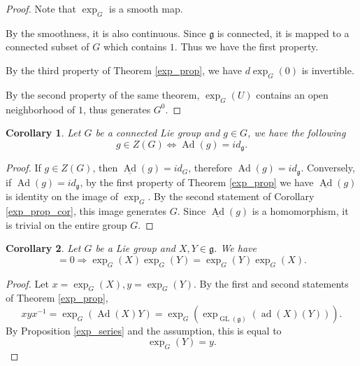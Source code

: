 \documentclass{article}
\newtheorem{corollary}{Corollary}[section]
\numberwithin{equation}{section}
\DeclareMathOperator{\Ad}{Ad}
\DeclareMathOperator{\ad}{ad}
\DeclareMathOperator{\GL}{GL}
\begin{document}
\begin{proof}Note that $\exp_G$ is a smooth map.\\
\par By the smoothness, it is also continuous. Since $\mathfrak{g}$ is connected, it is mapped to a connected subset of $G$ which contains $1$. Thus we have the first property.\\
\par By the third property of Theorem \ref{exp_prop}, we have $d\exp_G(0)$ is invertible.\\
\par By the second property of the same theorem, $\exp_G(U)$ contains an open neighborhood of $1$, thus generates $G^0$.
\end{proof}

\begin{corollary}
Let $G$ be a connected Lie group and $g\in G$, we have the following
\begin{equation*}
g\in Z(G) \Leftrightarrow \Ad(g) = id_{\mathfrak{g}}.
\end{equation*}
\end{corollary}

\begin{proof}
If $g\in Z(G)$, then $\underline{\Ad}(g) = id_G$, therefore $\Ad(g)=id_{\mathfrak{g}}$. Conversely, if $\Ad(g)=id_{\mathfrak{g}}$,  by the first property of Theorem \ref{exp_prop} we have $\underline{\Ad}(g)$ is identity on the image of $\exp_G$. By the second statement of Corollary \ref{exp_prop_cor}, this image generates $G$. Since $\underline{\Ad}(g)$ is a homomorphism, it is trivial on the entire group $G$.
\end{proof}

\begin{corollary}
Let $G$ be a Lie group and $X,Y\in\mathfrak{g}$. We have
\begin{equation*}
[X|Y] = 0\Rightarrow \exp_G(X)\exp_G(Y)=\exp_G(Y)\exp_G(X).
\end{equation*}
\end{corollary}
\begin{proof}
Let $x=\exp_G(X),y=\exp_G(Y)$. By the first and second statements of Theorem \ref{exp_prop}, 
\begin{equation*}
xyx^{-1}=\exp_G(\Ad(X)Y) = \exp_G(\exp_{\GL(\mathfrak{g})}(\ad(X)(Y))).
\end{equation*}
By Proposition \ref{exp_series} and the assumption, this is equal to 
\begin{equation*}
\exp_G(Y)=y.
\end{equation*}
\end{proof}
\end{document}
